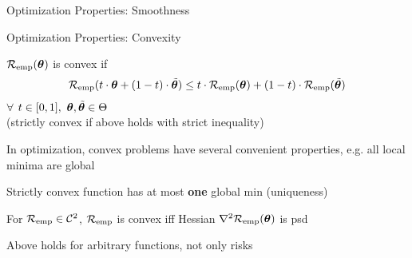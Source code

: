 \documentclass[11pt,compress,t,notes=noshow, xcolor=table]{beamer}
\begin{document}
\begin{frame}{Optimization Properties: Smoothness}


\end{frame}


\begin{framei}[sep=L]{Optimization Properties: Convexity}

\item $\mathcal{R}_{\text{emp}}(\bm{\theta})$ is convex if
$$
\mathcal{R}_{\text{emp}}(t \cdot \bm{\theta} + (1 - t) \cdot \tilde {\bm{\theta}}) \le t \cdot
\mathcal{R}_{\text{emp}}(\bm{\theta}) + (1 - t) \cdot \mathcal{R}_{\text{emp}}(\tilde {\bm{\theta}} )
$$
$\forall$ $t \in [0, 1], ~\bm{\theta}, \tilde {\bm{\theta}} \in \Theta$\\
(strictly convex if above holds with strict inequality)

\item In optimization, convex problems have several convenient properties, e.g. all local minima are global 
\item Strictly convex function has at most \textbf{one} global min (uniqueness)

\item For $\mathcal{R}_{\text{emp}} \in \mathcal{C}^{2}$, $\mathcal{R}_{\text{emp}}$ is convex iff Hessian $\nabla^2 \mathcal{R}_{\text{emp}}(\bm{\theta})$ is psd

\item Above holds for arbitrary functions, not only risks

\end{framei}
\end{document}
